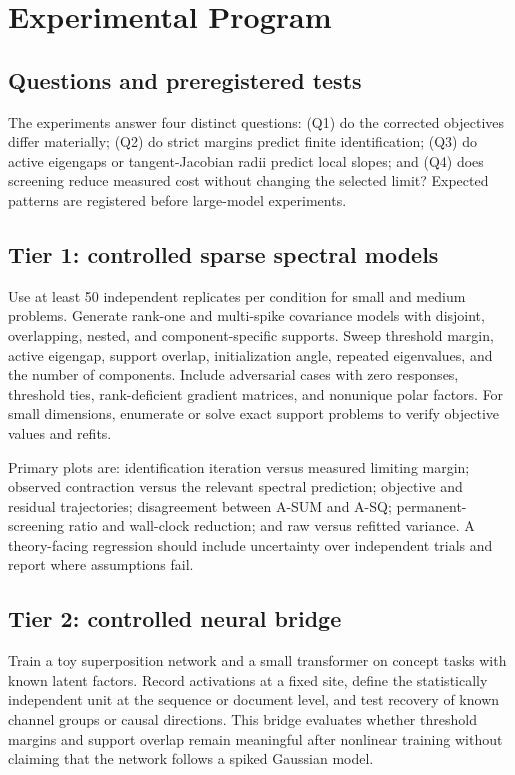 \section{Experimental Program}
\label{sec:experiments}



\subsection{Questions and preregistered tests}
The experiments answer four distinct questions: (Q1) do the corrected objectives differ materially; (Q2) do strict margins predict finite identification; (Q3) do active eigengaps or tangent-Jacobian radii predict local slopes; and (Q4) does screening reduce measured cost without changing the selected limit? Expected patterns are registered before large-model experiments.

\subsection{Tier 1: controlled sparse spectral models}
Use at least 50 independent replicates per condition for small and medium problems. Generate rank-one and multi-spike covariance models with disjoint, overlapping, nested, and component-specific supports. Sweep threshold margin, active eigengap, support overlap, initialization angle, repeated eigenvalues, and the number of components. Include adversarial cases with zero responses, threshold ties, rank-deficient gradient matrices, and nonunique polar factors. For small dimensions, enumerate or solve exact support problems to verify objective values and refits.

Primary plots are: identification iteration versus measured limiting margin; observed contraction versus the relevant spectral prediction; objective and residual trajectories; disagreement between A-SUM and A-SQ; permanent-screening ratio and wall-clock reduction; and raw versus refitted variance. A theory-facing regression should include uncertainty over independent trials and report where assumptions fail.

\subsection{Tier 2: controlled neural bridge}
Train a toy superposition network and a small transformer on concept tasks with known latent factors. Record activations at a fixed site, define the statistically independent unit at the sequence or document level, and test recovery of known channel groups or causal directions. This bridge evaluates whether threshold margins and support overlap remain meaningful after nonlinear training without claiming that the network follows a spiked Gaussian model.

